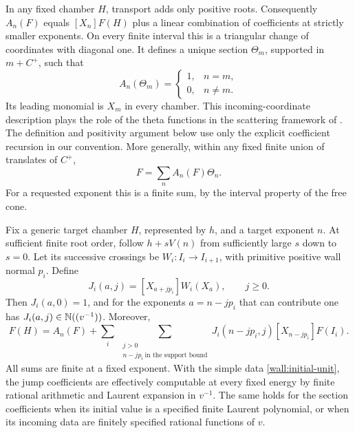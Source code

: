 In any fixed chamber $H$, transport adds only positive roots.
Consequently $A_n(F)$ equals $[X_n]F(H)$ plus a linear combination
of coefficients at strictly smaller exponents.  On every finite
interval this is a triangular change of coordinates with diagonal
one.  It defines a unique section $\Theta_m$, supported in
$m+C^+$, such that
\begin{equation}
 A_n(\Theta_m)=\begin{cases}1,&n=m,\\0,&n\ne m.\end{cases}
 \label{wall:theta-definition}
\end{equation}
Its leading monomial is $X_m$ in every chamber.  This incoming-coordinate
description plays the role of the theta functions in the scattering
framework of \cite{GHKK18,DM21}.  The definition and positivity argument
below use only the explicit coefficient recursion in our convention.  More generally,
within any fixed finite union of translates of $C^+$,
\begin{equation}
 F=\sum_n A_n(F)\Theta_n.
 \label{wall:theta-expansion}
\end{equation}
For a requested exponent this is a finite sum, by the interval
property of the free cone.

\begin{lemma}
\label{wall:recursion}
Fix a generic target chamber $H$, represented by $h$, and a target
exponent $n$.  At sufficient finite root order, follow
$h+sV(n)$ from sufficiently large $s$ down to $s=0$.  Let its
successive crossings be $W_i:I_i\longrightarrow I_{i+1}$, with
primitive positive wall normal $p_i$.  Define
\[
 J_i(a,j)=[X_{a+jp_i}]W_i(X_a),\qquad j\ge0.
\]
Then $J_i(a,0)=1$, and for the exponents $a=n-jp_i$ that can
contribute one has $J_i(a,j)\in\mathbb N((v^{-1}))$.  Moreover,
\begin{equation}
 [X_n]F(H)=A_n(F)+
 \sum_i\ \sum_{\substack{j>0\\n-jp_i\ \text{in the support bound}}}
 J_i(n-jp_i,j)[X_{n-jp_i}]F(I_i).
 \label{wall:coefficient-recursion}
\end{equation}
All sums are finite at a fixed exponent.  With the simple data
\eqref{wall:initial-unit}, the jump coefficients are effectively
computable at every fixed energy by finite rational arithmetic and
Laurent expansion in $v^{-1}$.  The same holds for the section
coefficients when its initial value is a specified finite Laurent
polynomial, or when its incoming data are finitely specified
rational functions of $v$.
\end{lemma}

